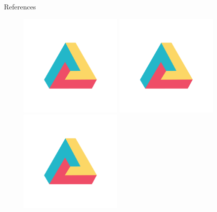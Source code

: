 \documentclass[22pt]{beamer}
\begin{document}
\begin{frame}[fragile]
\begin{textblock}{7.25}
\begin{block}{References}

{\scriptsize
}
\end{block}

\begin{figure}[htbp]
\centering
\includegraphics[height=5cm]{dh.png}
\hspace{1cm}
\includegraphics[height=5cm]{dh.png}
\hspace{1cm}
\includegraphics[height=5cm]{dh.png}
\hspace{1cm}

\end{figure}
\end{textblock}
\end{frame}
\end{document}
